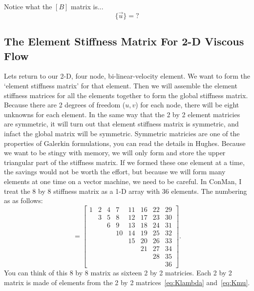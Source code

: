 \documentclass{article}
\begin{document}
Notice what the $[B]$ matrix is...
\begin{equation}
[B] \{\vec u\} = ?
\end{equation}

\subsection{The Element Stiffness Matrix For 2-D Viscous Flow}

Lets return to our 2-D, four node, bi-linear-velocity element.   We want to
form the `element stiffness matrix' for that element.   Then we will assemble
the element stiffness matrices for all the elements together to form the global
stiffness matrix.   Because there are 2 degrees of freedom ($u,v$) for each
node, there will be eight unknowns for each element.   In the same way that 
the 2 by 2 element matricies are symmetric, it will turn out that element
stiffness matrix is symmetric, and infact the global matrix will be symmetric. 
Symmetric matricies are one of the properties of Galerkin formulations, you
can read the details in Hughes.  Because we want to be stingy with memory, we
will only form and store the upper triangular part of the stiffness matrix.  
If we formed these one element at a time, the savings would not be worth the
effort, but because we will form many elements at one time on a vector machine,
we need to be careful.  In ConMan, I treat the 8 by 8 stiffness matrix as a 1-D
array with 36 elements.   The numbering as as follows:
\begin{equation}      
[K^e] = \left[ 
\begin{array}{cccccccc}    
 1 &  2 &  4 &  7 & 11 & 16 & 22 & 29 \\
   &  3 &  5 &  8 & 12 & 17 & 23 & 30 \\
   &    &  6 &  9 & 13 & 18 & 24 & 31 \\
   &    &    & 10 & 14 & 19 & 25 & 32 \\
   &    &    &    & 15 & 20 & 26 & 33 \\
   &    &    &    &    & 21 & 27 & 34 \\
   &    &    &    &    &    & 28 & 35 \\
   &    &    &    &    &    &    & 36 
\end{array} \right ].
\end{equation}
You can think of this 8 by 8 matrix as sixteen 2 by 2 matricies.   Each 2 by 2
matrix is made of elements from the 2 by 2 matrices~\ref{eq:Klambda}
and~\ref{eq:Kmu}.
\end{document}
